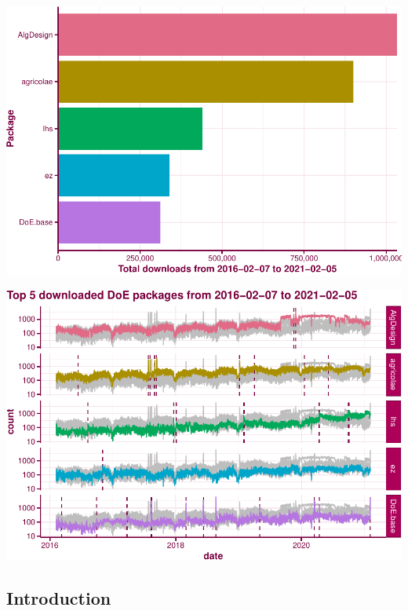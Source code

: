 \begin{Schunk}


\begin{center}\includegraphics{paper_files/figure-latex/download-barplot-1} \end{center}

\end{Schunk}

\begin{Schunk}


\begin{center}\includegraphics{paper_files/figure-latex/download-timeplot-1} \end{center}

\end{Schunk}

\hypertarget{introduction}{%
\subsection{Introduction}\label{introduction}}

